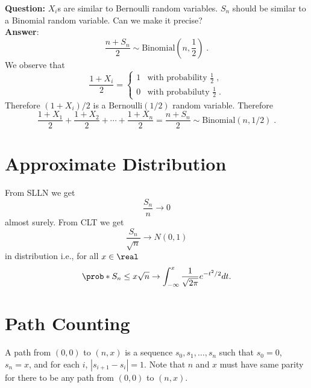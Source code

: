 \textbf{Question:} $X_i$s are similar to Bernoulli random variables. $S_n$ should be similar to a Binomial random variable. Can we make it precise?\\
\noindent\textbf{Answer}: 
\begin{equation}
\frac{n+S_n}{2}\sim\mathrm{Binomial}(n,\frac{1}{2})\;.
\end{equation}
We observe that
\begin{equation}
\frac{1+X_i}{2}=
\begin{cases}
1 & \mbox{with probability } \frac{1}{2} \;,\\
0 & \mbox{with probabiluty } \frac{1}{2} \;.
\end{cases}
\end{equation}
Therefore $(1+X_i)/2$ is a $\mathrm{Bernoulli}(1/2)$
random variable. Therefore
\begin{equation}
\frac{1+X_1}{2} + 
\frac{1+X_2}{2} +
\cdots +
\frac{1+X_n}{2}
=\frac{n+S_n}{2}
\sim\mathrm{Binomial}(n,1/2)\;.
\end{equation}

\section{Approximate Distribution}

From SLLN we get
\begin{equation}
\frac{S_n}{n}\to 0 
\end{equation}
almost surely. From CLT we get
\begin{equation}
\frac{S_n}{\sqrt{n}}\to N(0,1)
\end{equation}
in distribution i.e., for all $x\in\real$
\begin{equation}
\prob*{S_n\leq x\sqrt{n}}\to\int_{-\infty}^x
\frac{1}{\sqrt{2\pi}}e^{-t^2/2}dt.
\end{equation}

\section{Path Counting}

A path from $(0,0)$ to $(n,x)$ is a sequence $s_0,s_1,\ldots,s_n$ such that $s_0=0$, $s_n=x$, and for each $i$, $|s_{i+1}-s_{i}|=1$. Note that $n$ and $x$ must have same parity for there to be any path from $(0,0)$ to $(n,x)$.

